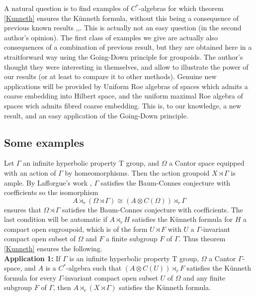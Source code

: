 A natural question is to find examples of $C^*$-algebras for which theorem \ref{Kunneth} ensures the Künneth formula, without this being a consequence of previous known results \cite{RosenbergKunneth},\cite{ChabertEOY},\cite{OY4}. This is actually not an easy question (in the second author's opinion). The first class of examples we give are actually also consequences of a combination of previous result, but they are obtained here in a straitforward way using the Going-Down principle for groupoids. The author's thought they were interesting in themselves, and allow to illustrate the power of our results (or at least to compare it to other methods). Genuine new applications will be provided by Uniform Roe algebras of spaces which admits a coarse embedding into Hilbert space, and the uniform maximal Roe algebra of spaces wich admits fibred coarse embedding. This is, to our knowledge, a new result, and an easy application of the Going-Down principle.\\ %

\subsection{Some examples}

Let $\Gamma$ an infinite hyperbolic property T group, and $\Omega$ a Cantor space equipped with an action of $\Gamma$ by homeomorphisms. Then the action groupoid $X\rtimes \Gamma$ is ample.%
By Lafforgue's work \cite{lafforgue2012conjecture}, $\Gamma$ satisfies the Baum-Connes conjecture with coefficients so the isomorphism \[A\rtimes_r (\Omega\rtimes \Gamma) \cong (A\otimes C(\Omega))\rtimes_r \Gamma \]
ensures that $\Omega\rtimes \Gamma$ satisfies the Baum-Connes conjecture with coefficients. The last condition will be automatic if $A\rtimes_r H$ satisfies the Künneth formula for $H$ a compact open sugroupoid, which is of the form $U\rtimes F $ with $U $ a $\Gamma$-invariant compact open subset of $\Omega$ and $F$ a finite subgroup $F$ of $\Gamma$. Thus theorem \ref{Kunneth} ensures the following.\\

\textbf{Application 1: } If $\Gamma$ is an infinite hyperbolic property T group, $\Omega$ a Cantor $\Gamma$-space, and $A$ is a $C^*$-algebra such that $(A\otimes C(U))\rtimes_r F$ satisfies the Künneth formula for every $\Gamma$-invariant compact open subset $U$ of $\Omega$ and any finite subgroup $F$ of $\Gamma$, then $A \rtimes_r (X\rtimes \Gamma)$ satisfies the Künneth formula. \\ 

